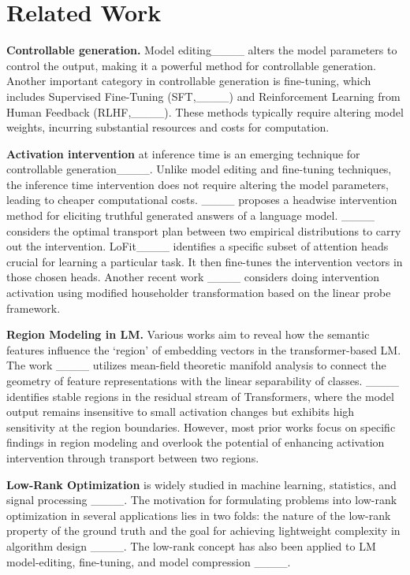 \section{Related Work}
\textbf{Controllable generation.}  Model editing____ alters the model parameters to control the output, making it a powerful method for controllable generation. Another important category in controllable generation is fine-tuning, which includes Supervised Fine-Tuning (SFT,____) and Reinforcement Learning from Human Feedback (RLHF,____). These methods typically require altering model weights, incurring substantial resources and costs for computation.
 
\noindent \textbf{Activation intervention} at inference time is an emerging technique for controllable generation____. Unlike model editing and fine-tuning techniques, the inference time intervention does not require altering the model parameters, leading to cheaper computational costs. ____ proposes a headwise intervention method for eliciting truthful generated answers of a language model. ____ considers the optimal transport plan between two empirical distributions to carry out the intervention. LoFit____ identifies a specific subset of attention heads crucial for learning a particular task. It then fine-tunes the intervention vectors in those chosen heads. Another recent work ____ considers doing intervention activation using modified householder transformation based on the linear probe framework. 

\noindent \textbf{Region Modeling in LM.}
Various works aim to reveal how the semantic features influence the `region' of embedding vectors in the transformer-based LM. The work ____ utilizes mean-field theoretic manifold analysis to connect the geometry of feature representations with the linear separability of classes. ____ identifies stable regions in the residual stream of Transformers, where the model output remains insensitive to small activation changes but exhibits high sensitivity at the region boundaries. However, most prior works focus on specific findings in region modeling and overlook the potential of enhancing activation intervention through transport between two regions.

\noindent \textbf{Low-Rank Optimization} is widely studied in machine learning, statistics, and signal processing ____. The motivation for formulating problems into low-rank optimization in several applications lies in two folds: the nature of the low-rank property of the ground truth and the goal for achieving lightweight complexity in algorithm design ____.  
The low-rank concept has also been applied to LM model-editing, fine-tuning, and model compression ____.